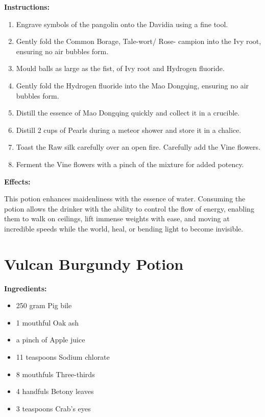 \documentclass{article}
\begin{document}
\textbf{Instructions:}

\begin{enumerate}
  \item Engrave symbols of the pangolin onto the Davidia using a fine tool.
  \item Gently fold the Common Borage, Tale-wort/ Rose- campion into the Ivy root, ensuring no air bubbles form.
  \item Mould balls as large as the fist, of Ivy root and Hydrogen fluoride.
  \item Gently fold the Hydrogen fluoride into the Mao Dongqing, ensuring no air bubbles form.
  \item Distill the essence of Mao Dongqing quickly and collect it in a crucible.
  \item Distill 2 cups of Pearls during a meteor shower and store it in a chalice.
  \item Toast the Raw silk carefully over an open fire. Carefully add the Vine flowers.
  \item Ferment the Vine flowers with a pinch of the mixture for added potency.
\end{enumerate}

\textbf{Effects:}

This potion enhances maidenliness with the essence of water. Consuming the potion allows the drinker with the ability to control the flow of energy, enabling them to walk on ceilings, lift immense weights with ease, and moving at incredible speeds while the world, heal, or bending light to become invisible.

\newpage
\section*{Vulcan Burgundy Potion}

\textbf{Ingredients:}

\begin{itemize}
  \item 250 gram Pig bile
  \item 1 mouthful Oak ash
  \item a pinch of Apple juice
  \item 11 teaspoons Sodium chlorate
  \item 8 mouthfuls Three-thirds
  \item 4 handfuls Betony leaves
  \item 3 teaspoons Crab's eyes
\end{itemize}
\end{document}
